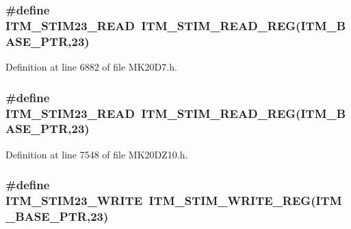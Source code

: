 \subsubsection[{\texorpdfstring{I\+T\+M\+\_\+\+S\+T\+I\+M23\+\_\+\+R\+E\+AD}{ITM_STIM23_READ}}]{\setlength{\rightskip}{0pt plus 5cm}\#define I\+T\+M\+\_\+\+S\+T\+I\+M23\+\_\+\+R\+E\+AD~{\bf I\+T\+M\+\_\+\+S\+T\+I\+M\+\_\+\+R\+E\+A\+D\+\_\+\+R\+EG}({\bf I\+T\+M\+\_\+\+B\+A\+S\+E\+\_\+\+P\+TR},23)}\hypertarget{group___i_t_m___register___accessor___macros_gaa2155b2b5a6c7d6a8a3cc643a4bd4af6}{}\label{group___i_t_m___register___accessor___macros_gaa2155b2b5a6c7d6a8a3cc643a4bd4af6}


Definition at line 6882 of file M\+K20\+D7.\+h.

\subsubsection[{\texorpdfstring{I\+T\+M\+\_\+\+S\+T\+I\+M23\+\_\+\+R\+E\+AD}{ITM_STIM23_READ}}]{\setlength{\rightskip}{0pt plus 5cm}\#define I\+T\+M\+\_\+\+S\+T\+I\+M23\+\_\+\+R\+E\+AD~{\bf I\+T\+M\+\_\+\+S\+T\+I\+M\+\_\+\+R\+E\+A\+D\+\_\+\+R\+EG}({\bf I\+T\+M\+\_\+\+B\+A\+S\+E\+\_\+\+P\+TR},23)}\hypertarget{group___i_t_m___register___accessor___macros_gaa2155b2b5a6c7d6a8a3cc643a4bd4af6}{}\label{group___i_t_m___register___accessor___macros_gaa2155b2b5a6c7d6a8a3cc643a4bd4af6}


Definition at line 7548 of file M\+K20\+D\+Z10.\+h.

\subsubsection[{\texorpdfstring{I\+T\+M\+\_\+\+S\+T\+I\+M23\+\_\+\+W\+R\+I\+TE}{ITM_STIM23_WRITE}}]{\setlength{\rightskip}{0pt plus 5cm}\#define I\+T\+M\+\_\+\+S\+T\+I\+M23\+\_\+\+W\+R\+I\+TE~{\bf I\+T\+M\+\_\+\+S\+T\+I\+M\+\_\+\+W\+R\+I\+T\+E\+\_\+\+R\+EG}({\bf I\+T\+M\+\_\+\+B\+A\+S\+E\+\_\+\+P\+TR},23)}\hypertarget{group___i_t_m___register___accessor___macros_gaca71beb45d1448267f6f0f4ae952ce42}{}\label{group___i_t_m___register___accessor___macros_gaca71beb45d1448267f6f0f4ae952ce42}


